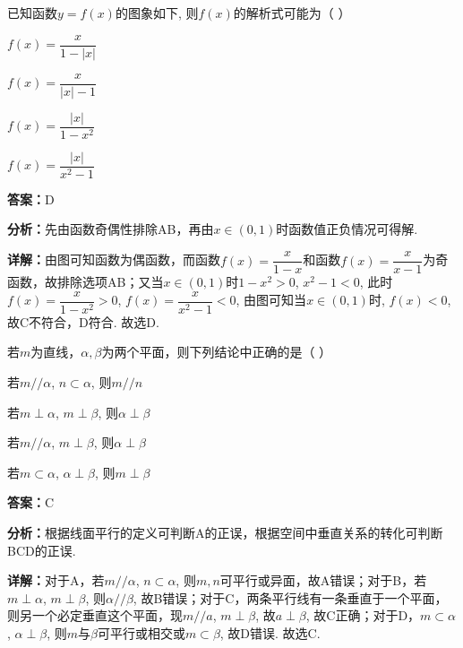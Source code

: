 \begin{question}[points=5]
已知函数$y = f(x)$的图象如下, 则$f(x)$的解析式可能为（   ）
\begin{choices}
  \item $f(x) = \dfrac{x}{1 - |x|}$
  \item $f(x) = \dfrac{x}{|x| - 1}$
  \item $f(x) = \dfrac{|x|}{1 - x^2}$
  \item $f(x) = \dfrac{|x|}{x^2 - 1}$
\end{choices}
\begin{solution}
\textbf{答案：}D

\textbf{分析：}先由函数奇偶性排除AB，再由$x \in (0,1)$时函数值正负情况可得解.

\textbf{详解：}由图可知函数为偶函数，而函数$f(x) = \dfrac{x}{1-x}$和函数$f(x) = \dfrac{x}{x-1}$为奇函数，故排除选项AB；又当$x \in (0,1)$时$1 - x^2 > 0$, $x^2 - 1 < 0$, 此时$f(x) = \dfrac{x}{1-x^2} > 0$, $f(x) = \dfrac{x}{x^2-1} < 0$, 由图可知当$x \in (0,1)$时, $f(x) < 0$, 故C不符合，D符合. 故选D.
\end{solution}
\end{question}

\begin{question}[points=5]
若$m$为直线，$\alpha, \beta$为两个平面，则下列结论中正确的是（   ）
\begin{choices}
  \item 若$m // \alpha$, $n \subset \alpha$, 则$m // n$
  \item 若$m \perp \alpha$, $m \perp \beta$, 则$\alpha \perp \beta$
  \item 若$m // \alpha$, $m \perp \beta$, 则$\alpha \perp \beta$
  \item 若$m \subset \alpha$, $\alpha \perp \beta$, 则$m \perp \beta$
\end{choices}
\begin{solution}
\textbf{答案：}C

\textbf{分析：}根据线面平行的定义可判断A的正误，根据空间中垂直关系的转化可判断BCD的正误.

\textbf{详解：}对于A，若$m // \alpha$, $n \subset \alpha$, 则$m, n$可平行或异面，故A错误；对于B，若$m \perp \alpha$, $m \perp \beta$, 则$\alpha // \beta$, 故B错误；对于C，两条平行线有一条垂直于一个平面，则另一个必定垂直这个平面，现$m // a$, $m \perp \beta$, 故$a \perp \beta$, 故C正确；对于D，$m \subset \alpha$, $\alpha \perp \beta$, 则$m$与$\beta$可平行或相交或$m \subset \beta$, 故D错误. 故选C.
\end{solution}
\end{question}

